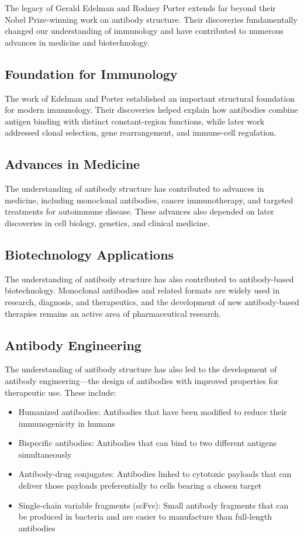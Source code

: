 The legacy of Gerald Edelman and Rodney Porter extends far beyond their Nobel Prize-winning work on antibody structure. Their discoveries fundamentally changed our understanding of immunology and have contributed to numerous advances in medicine and biotechnology.

\subsection{Foundation for Immunology}

The work of Edelman and Porter established an important structural foundation for modern immunology. Their discoveries helped explain how antibodies combine antigen binding with distinct constant-region functions, while later work addressed clonal selection, gene rearrangement, and immune-cell regulation.

\subsection{Advances in Medicine}

The understanding of antibody structure has contributed to advances in medicine, including monoclonal antibodies, cancer immunotherapy, and targeted treatments for autoimmune disease. These advances also depended on later discoveries in cell biology, genetics, and clinical medicine.

\subsection{Biotechnology Applications}

The understanding of antibody structure has also contributed to antibody-based biotechnology. Monoclonal antibodies and related formats are widely used in research, diagnosis, and therapeutics, and the development of new antibody-based therapies remains an active area of pharmaceutical research.

\subsection{Antibody Engineering}

The understanding of antibody structure has also led to the development of antibody engineering---the design of antibodies with improved properties for therapeutic use. These include:

\begin{itemize}
\item Humanized antibodies: Antibodies that have been modified to reduce their immunogenicity in humans
\item Bispecific antibodies: Antibodies that can bind to two different antigens simultaneously
\item Antibody-drug conjugates: Antibodies linked to cytotoxic payloads that can deliver those payloads preferentially to cells bearing a chosen target
\item Single-chain variable fragments (scFvs): Small antibody fragments that can be produced in bacteria and are easier to manufacture than full-length antibodies
\end{itemize}

